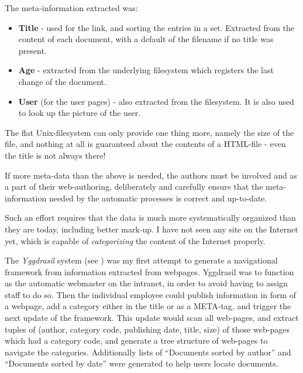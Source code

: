 The meta-information extracted was:

\begin{itemize}
\item \textbf{Title} - used for the link, and sorting the entries in a
  set.  Extracted from the content of each document, with a default of
  the filename if no title was present.
\item \textbf{Age} - extracted from the underlying filesystem which
  registers the last change of the document.
\item \textbf{User} (for the user pages) - also extracted from the
  filesystem.  It is also used to look up the picture of the user.


\end{itemize}

The flat Unix-filesystem can only provide one thing more,
namely the size of the file, and nothing at all is
guaranteed about the contents of a HTML-file - even the
title is not always there!

If more meta-data than the above is needed, the authors must be
involved and as a part of their web-authoring, deliberately and
carefully ensure that the meta-information needed by the automatic
processes is correct and up-to-date.

Such an effort requires that the data is much more systematically
organized than they are today, including better mark-up.  I have not
seen any site on the Internet yet, which is capable of
\textit{categorizing} the content of the Internet properly.

The \textit{Yggdrasil} system (see
) was my first attempt to
generate a navigational framework from information extracted
from webpages.  Yggdrasil was to function as the automatic
webmaster on the intranet, in order to avoid having to
assign staff to do so.  Then the individual employee could
publish information in form of a webpage, add a category
either in the title or as a META-tag, and trigger the next
update of the framework.  This update would scan all
web-pages, and extract tuples of (author, category code,
publishing date, title, size) of those web-pages which had a
category code, and generate a tree structure of web-pages to
navigate the categories.  Additionally lists of ``Documents
sorted by author'' and ``Documents sorted by date'' were
generated to help users locate documents.


